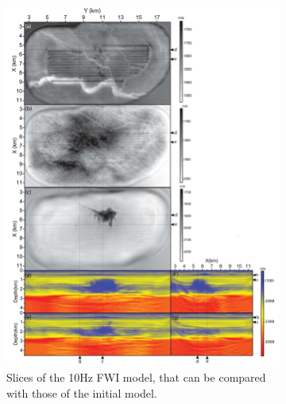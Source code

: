 \begin{figure}
\centering 
  \begin{subfigure}[b]{0.4\textwidth}
    \includegraphics[width=\textwidth]{images/sim2.png}
    \caption{Slices of the 10Hz FWI model, that can be compared with those of the initial model\cite{Operto2015}. }
    \label{sim2}
  \end{subfigure}
  \begin{subfigure}[b]{0.4\textwidth}

\end{subfigure}
\end{figure}
